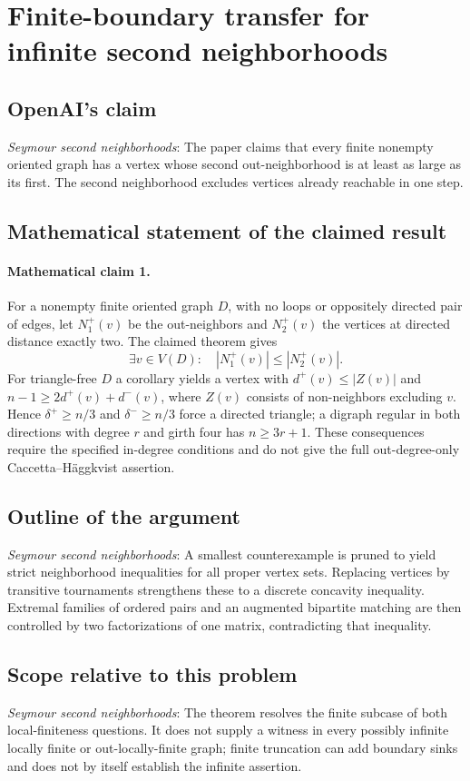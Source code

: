 \documentclass[11pt]{article}
\begin{document}
\section*{Finite-boundary transfer for infinite second neighborhoods}

\subsection{OpenAI's claim}
\textit{Seymour second neighborhoods}: The paper claims that every finite nonempty oriented graph has a vertex whose second out-neighborhood is at least as large as its first. The second neighborhood excludes vertices already reachable in one step.

\subsection{Mathematical statement of the claimed result}
\paragraph{Mathematical claim 1.} For a nonempty finite oriented graph $D$, with no loops or oppositely directed pair of edges, let $N_1^+(v)$ be the out-neighbors and $N_2^+(v)$ the vertices at directed distance exactly two. The claimed theorem gives \[\exists v\in V(D):\quad|N_1^+(v)|\le|N_2^+(v)|.\] For triangle-free $D$ a corollary yields a vertex with $d^+(v)\le|Z(v)|$ and $n-1\ge2d^+(v)+d^-(v)$, where $Z(v)$ consists of non-neighbors excluding $v$. Hence $\delta^+\ge n/3$ and $\delta^-\ge n/3$ force a directed triangle; a digraph regular in both directions with degree $r$ and girth four has $n\ge3r+1$. These consequences require the specified in-degree conditions and do not give the full out-degree-only Caccetta--H\"aggkvist assertion.

\subsection{Outline of the argument}
\textit{Seymour second neighborhoods}: A smallest counterexample is pruned to yield strict neighborhood inequalities for all proper vertex sets. Replacing vertices by transitive tournaments strengthens these to a discrete concavity inequality. Extremal families of ordered pairs and an augmented bipartite matching are then controlled by two factorizations of one matrix, contradicting that inequality.

\subsection{Scope relative to this problem}
\textit{Seymour second neighborhoods}: The theorem resolves the finite subcase of both local-finiteness questions. It does not supply a witness in every possibly infinite locally finite or out-locally-finite graph; finite truncation can add boundary sinks and does not by itself establish the infinite assertion.
\end{document}
